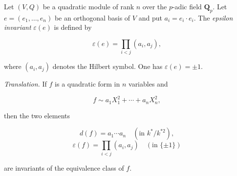 Let $(V,Q)$ be a quadratic module of rank $n$ over the $p$-adic field $\mathbf{Q}_p$. Let $e = (e_1,\ldots,e_n)$ be an orthogonal basis of $V$ and put $a_i = e_i \cdot e_i$. The \emph{epsilon invariant} $\varepsilon(e)$ is defined by

$$\varepsilon(e) = \prod_{i < j} (a_i, a_j),$$

where $(a_i, a_j)$ denotes the Hilbert symbol. One has $\varepsilon(e) = \pm 1$.

\textit{Translation.} If $f$ is a quadratic form in $n$ variables and

$$f \sim a_1 X_1^2 + \cdots + a_n X_n^2,$$

then the two elements

$$d(f) = a_1 \cdots a_n \quad (\text{in } k^*/k^{*2}),$$
$$\varepsilon(f) = \prod_{i < j} (a_i, a_j) \quad (\text{in } \{\pm 1\})$$

are invariants of the equivalence class of $f$.
